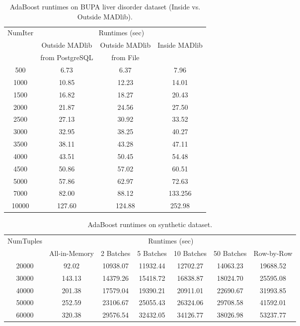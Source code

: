 \begin{table}[!htbp]
\small
\centering
\begin{tabular}{|c|c|c|c|}
\hline
\multirow{3}{*}{NumIter}&\multicolumn{3}{|c|}{Runtimes (sec)}\\
\cline{2-4}
&Outside MADlib&Outside MADlib&\multirow{2}{*}{Inside MADlib}\\
&from PostgreSQL&from File&\\
\hline
500&6.73 &6.37 &7.96 \\
\hline
1000&10.85 &12.23 &14.01 \\\hline
1500&16.82 &18.27 &20.43 \\\hline
2000&21.87 &24.56 &27.50 \\\hline
2500&27.13 &30.92 &33.52 \\\hline
3000&32.95 &38.25 &40.27 \\\hline
3500&38.11 &43.28 &47.11 \\\hline
4000&43.51 &50.45 &54.48 \\\hline
4500&50.86 &57.02 &60.51 \\\hline
5000&57.86 &62.97 &72.63 \\\hline
7000&82.00 &88.12 &133.256 \\\hline
10000&127.60 &124.88 &252.98 \\
\hline
\end{tabular}
\caption{AdaBoost runtimes on BUPA liver disorder dataset (Inside vs. Outside MADlib).}
\label{tab:adaBupa2}
\end{table}

\begin{table}[!htbp]
\small
\centering
\begin{tabular}{|c|c|c|c|c|c|c|}
\hline
\multirow{2}{*}{NumTuples} & \multicolumn{6}{|c|}{Runtimes (sec)}\\
\cline{2-7}
& All-in-Memory & 2 Batches & 5 Batches & 10 Batches & 50 Batches & Row-by-Row\\
\hline
20000&92.02 &10938.07 &11932.44 &12702.27 &14063.23 &19688.52 \\
\hline
30000&143.13 &14379.26 &15418.72 &16838.87 &18024.70 &25595.08 \\
\hline
40000&201.38 &17579.04 &19390.21 &20911.01 &22690.67 &31993.85 \\
\hline
50000&252.59 &23106.67 &25055.43 &26324.06 &29708.58 &41592.01 \\
\hline
60000&320.38 &29576.54 &32432.05 &34126.77 &38026.98 &53237.77 \\
\hline
\end{tabular}
\caption{AdaBoost runtimes on synthetic dataset.}
\label{tab:adaSynth1}
\end{table}

